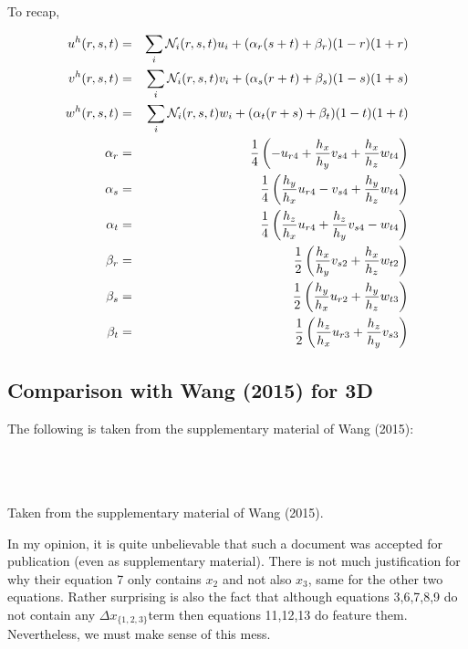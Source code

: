 To recap,
\begin{mdframed}[backgroundcolor=blue!5]
\begin{eqnarray}
u^h(r,s,t)&=&\sum_i {\mathcal{N}}_i(r,s,t) u_i + (\alpha_r (s + t) +\beta_r)(1-r)(1+r) \nonumber\\
v^h(r,s,t)&=&\sum_i {\mathcal{N}}_i(r,s,t) v_i + (\alpha_s (r + t) +\beta_s)(1-s)(1+s) \nonumber\\
w^h(r,s,t)&=&\sum_i {\mathcal{N}}_i(r,s,t) w_i + (\alpha_t (r + s) +\beta_t)(1-t)(1+t) \nonumber\\
\alpha_r &=& \frac14 \left( - u_{r4} +  \frac{h_x}{h_y}v_{s4} + \frac{h_x}{h_z} w_{t4}    \right) \nonumber\\
\alpha_s &=& \frac14 \left( \frac{h_y}{h_x} u_{r4} - v_{s4} +  \frac{h_y}{h_z} w_{t4}  \right) \nonumber\\
\alpha_t &=& \frac14 \left(  \frac{h_z}{h_x} u_{r4} +\frac{h_z}{h_y} v_{s4}-  w_{t4}  \right) \nonumber\\
\beta_r &=& \frac{1}{2} \left( \frac{h_x}{h_y} v_{s2} + \frac{h_x}{h_z} w_{t2} \right) \nonumber\\
\beta_s &=& \frac{1}{2} \left(\frac{h_y}{h_x} u_{r2} + \frac{h_y}{h_z}  w_{t3} \right) \nonumber\\
\beta_t &=& \frac{1}{2} \left( \frac{h_z}{h_x} u_{r3} + \frac{h_z}{h_y}  v_{s3} \right) \nonumber
\end{eqnarray}
\end{mdframed}




\subsection{Comparison with Wang \etal (2015) for 3D}

The following is taken from the supplementary material of Wang \etal (2015):
\begin{center}
\\
\\
\\
{\captionfont Taken from the supplementary material of Wang \etal (2015).}
\end{center}
In my opinion, it is quite unbelievable that such a document was accepted for publication
(even as supplementary material). 
There is not much justification for why their equation 7 only contains $x_2$ and not also 
$x_3$, same for the other two equations. 
Rather surprising is also the fact that although equations 3,6,7,8,9 do not contain 
any $\Delta x_{\{1,2,3\}}$term  then equations 11,12,13 do feature them. 
Nevertheless, we must make sense of this mess. 

